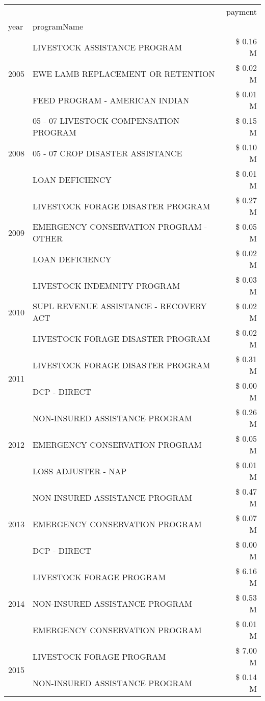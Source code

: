 \begin{tabular}{llr}
\toprule
 &  & payment \\
year & programName &  \\
\midrule
\multirow[t]{3}{*}{2005} & LIVESTOCK ASSISTANCE PROGRAM & \$ 0.16 M \\
 & EWE LAMB REPLACEMENT OR RETENTION & \$ 0.02 M \\
 & FEED PROGRAM - AMERICAN INDIAN & \$ 0.01 M \\
\cline{1-3}
\multirow[t]{3}{*}{2008} & 05 - 07 LIVESTOCK COMPENSATION PROGRAM & \$ 0.15 M \\
 & 05 - 07 CROP DISASTER ASSISTANCE & \$ 0.10 M \\
 & LOAN DEFICIENCY & \$ 0.01 M \\
\cline{1-3}
\multirow[t]{3}{*}{2009} & LIVESTOCK FORAGE DISASTER  PROGRAM & \$ 0.27 M \\
 & EMERGENCY CONSERVATION PROGRAM - OTHER & \$ 0.05 M \\
 & LOAN DEFICIENCY & \$ 0.02 M \\
\cline{1-3}
\multirow[t]{3}{*}{2010} & LIVESTOCK INDEMNITY PROGRAM & \$ 0.03 M \\
 & SUPL REVENUE ASSISTANCE - RECOVERY ACT & \$ 0.02 M \\
 & LIVESTOCK FORAGE DISASTER PROGRAM & \$ 0.02 M \\
\cline{1-3}
\multirow[t]{2}{*}{2011} & LIVESTOCK FORAGE DISASTER PROGRAM & \$ 0.31 M \\
 & DCP - DIRECT & \$ 0.00 M \\
\cline{1-3}
\multirow[t]{3}{*}{2012} & NON-INSURED ASSISTANCE PROGRAM & \$ 0.26 M \\
 & EMERGENCY CONSERVATION PROGRAM & \$ 0.05 M \\
 & LOSS ADJUSTER - NAP & \$ 0.01 M \\
\cline{1-3}
\multirow[t]{3}{*}{2013} & NON-INSURED ASSISTANCE PROGRAM & \$ 0.47 M \\
 & EMERGENCY CONSERVATION PROGRAM & \$ 0.07 M \\
 & DCP - DIRECT & \$ 0.00 M \\
\cline{1-3}
\multirow[t]{3}{*}{2014} & LIVESTOCK FORAGE PROGRAM & \$ 6.16 M \\
 & NON-INSURED ASSISTANCE PROGRAM & \$ 0.53 M \\
 & EMERGENCY CONSERVATION PROGRAM & \$ 0.01 M \\
\cline{1-3}
\multirow[t]{3}{*}{2015} & LIVESTOCK FORAGE PROGRAM & \$ 7.00 M \\
 & NON-INSURED ASSISTANCE PROGRAM & \$ 0.14 M \\

\end{tabular}

